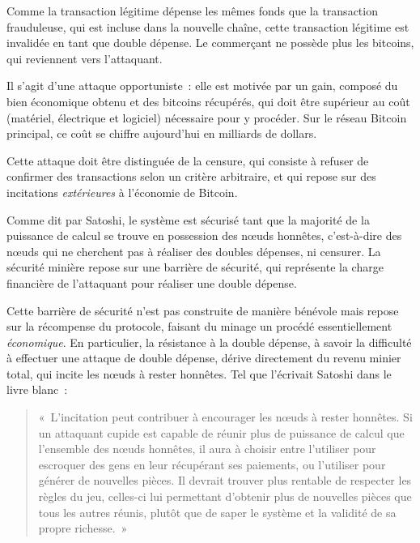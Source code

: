 Comme la transaction légitime dépense les mêmes fonds que la transaction frauduleuse, qui est incluse dans la nouvelle chaîne, cette transaction légitime est invalidée en tant que double dépense. Le commerçant ne possède plus les bitcoins, qui reviennent vers l'attaquant.

Il s'agit d'une attaque opportuniste~: elle est motivée par un gain, composé du bien économique obtenu et des bitcoins récupérés, qui doit être supérieur au coût (matériel, électrique et logiciel) nécessaire pour y procéder. Sur le réseau Bitcoin principal, ce coût se chiffre aujourd'hui en milliards de dollars.

Cette attaque doit être distinguée de la censure, qui consiste à refuser de confirmer des transactions selon un critère arbitraire, et qui repose sur des incitations \emph{extérieures} à l'économie de Bitcoin.


Comme dit par Satoshi, le système est sécurisé tant que la majorité de la puissance de calcul se trouve en possession des nœuds honnêtes, c'est-à-dire des nœuds qui ne cherchent pas à réaliser des doubles dépenses, ni censurer. La sécurité minière repose sur une barrière de sécurité, qui représente la charge financière de l'attaquant pour réaliser une double dépense.

Cette barrière de sécurité n'est pas construite de manière bénévole mais repose sur la récompense du protocole, faisant du minage un procédé essentiellement \emph{économique}. En particulier, la résistance à la double dépense, à savoir la difficulté à effectuer une attaque de double dépense, dérive directement du revenu minier total, qui incite les nœuds à rester honnêtes. Tel que l'écrivait Satoshi dans le livre blanc~:

\begin{quote}
«~L'incitation peut contribuer à encourager les nœuds à rester honnêtes. Si un attaquant cupide est capable de réunir plus de puissance de calcul que l'ensemble des nœuds honnêtes, il aura à choisir entre l'utiliser pour escroquer des gens en leur récupérant ses paiements, ou l'utiliser pour générer de nouvelles pièces. Il devrait trouver plus rentable de respecter les règles du jeu, celles-ci lui permettant d'obtenir plus de nouvelles pièces que tous les autres réunis, plutôt que de saper le système et la validité de sa propre richesse.~»
\end{quote}

